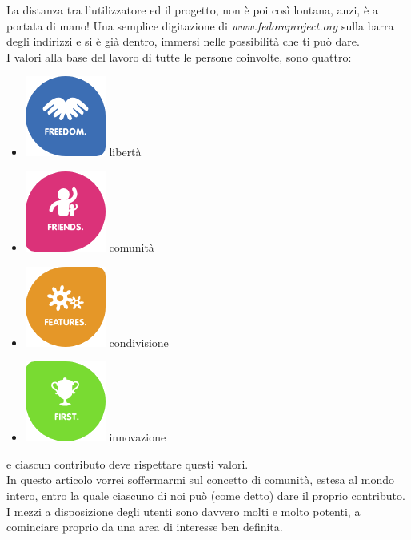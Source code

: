 La distanza tra l'utilizzatore ed il progetto, non è poi così lontana, anzi, è a
portata di mano! Una semplice digitazione di {\itshape www.fedoraproject.org} sulla barra degli
indirizzi e si è già dentro, immersi nelle possibilità che ti può
dare.\\
I valori alla base del lavoro di tutte le persone coinvolte, sono quattro:
\begin{itemize}
\item \includegraphics[scale=.20]{articoli/varie/immagini/4f-freedom.png} libertà 
\item \includegraphics[scale=.20]{articoli/varie/immagini/4f-friends.png} comunità
\item \includegraphics[scale=.20]{articoli/varie/immagini/4f-features.png} condivisione
\item \includegraphics[scale=.20]{articoli/varie/immagini/4f-first.png} innovazione
\end{itemize}
e ciascun contributo deve rispettare questi valori.\\

In questo articolo vorrei soffermarmi sul concetto di comunità, estesa al mondo intero, entro la quale ciascuno di noi può (come detto) dare il proprio contributo.\\

I mezzi a disposizione degli utenti sono davvero molti e molto potenti, a cominciare proprio da una area di interesse ben definita.\\

